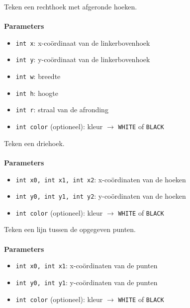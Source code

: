 \documentclass[11pt,fleqn]{book} %
\begin{document}
\begin{libf}[drawRoundRect(x, y, w, h, r, \emph{color=WHITE})]
	Teken een rechthoek met afgeronde hoeken.\\ \\
	\textbf{Parameters}
	\begin{itemize}
		\item \texttt{int x}: x-coördinaat van de linkerbovenhoek
		\item \texttt{int y}: y-coördinaat van de linkerbovenhoek
		\item \texttt{int w}: breedte
		\item \texttt{int h}: hoogte
		\item \texttt{int r}: straal van de afronding
		\item \texttt{int color} (optioneel): kleur $\rightarrow$ \texttt{WHITE} of \texttt{BLACK}
	\end{itemize}
\end{libf}

\begin{libf}[drawTriangle(x0, y0, x1, y1, x2, y2, \emph{color=WHITE})]
	Teken een driehoek.\\ \\
	\textbf{Parameters}
	\begin{itemize}
		\item \texttt{int x0, int x1, int x2}: x-coördinaten van de hoeken
		\item \texttt{int y0, int y1, int y2}: y-coördinaten van de hoeken
		\item \texttt{int color} (optioneel): kleur $\rightarrow$ \texttt{WHITE} of \texttt{BLACK}
	\end{itemize}
\end{libf}

\begin{libf}[drawLine(x0, y0, x1, y1, \emph{color=WHITE})]
	Teken een lijn tussen de opgegeven punten.\\ \\
	\textbf{Parameters}
	\begin{itemize}
		\item \texttt{int x0, int x1}: x-coördinaten van de punten
		\item \texttt{int y0, int y1}: y-coördinaten van de punten
		\item \texttt{int color} (optioneel): kleur $\rightarrow$ \texttt{WHITE} of \texttt{BLACK}
	\end{itemize}
\end{libf}
\end{document}
